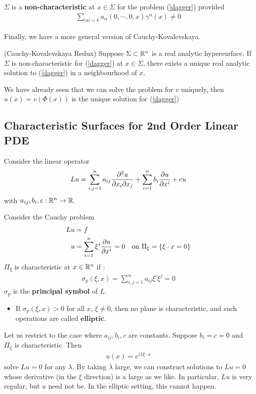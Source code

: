 \documentclass[10pt,a4paper]{report}
\newenvironment{proof}
{\begin{changemargin}{1cm}{0.5cm} 
	}%
	{\end{changemargin}
}
\begin{document}
 $\Sigma$ is a \textbf{non-characteristic} at $x\in \Sigma$ for the problem (\ref{dagger}) provided
\begin{align*}
\sum_{|\alpha| =k} a_{\alpha} (0,\cdots,0,x) \gamma^{\alpha}(x) \neq 0
\end{align*}
\s

Finally, we have a more general version of Cauchy-Kovalevskaya.
\s

\thm (Cauchy-Kovalevskaya Redux) Suppose $\Sigma \subset \mathbb{R}^n$ is a real analytic hypersurface. If $\Sigma$ is non-characteristic for (\ref{dagger}) at $x\in \Sigma$, there exists a unique real analytic solution to (\ref{dagger}) in a neighbourhood of $x$.
\begin{proof}
\pf We have already seen that we can solve the problem for $v$ uniquely, then $u(x)  = v(\Phi(x))$ is the unique solution for (\ref{dagger})

\eop
\end{proof}
\s

\subsection*{Characteristic Surfaces for 2nd Order Linear PDE}

Consider the linear operator
\begin{align*}
Lu = \sum_{i,j=1}^n a_{ij}\frac{\partial^2 u}{\partial x_i \partial x_j} + \sum_{i=1}^n b_i \frac{\partial u}{\partial x^i} + cu
\end{align*}
with $a_{ij},b_i,c : \mathbb{R}^n \rightarrow \mathbb{R}$.
\s

Consider the Cauchy problem
\begin{align*}
Lu& = f \\
u &= \sum_{i=1}^n \xi^i \frac{\partial u}{\partial x^i} = 0 \quad \text{on } \Pi_{\xi} = \{ \xi \cdot x =0 \}
\end{align*}
$\Pi_{\xi}$ is characteristic at $x\in \mathbb{R}^n$ if : 
\begin{align*}
\sigma_p (\xi, x) = \sum_{i,j=1}^n a_{ij}\xi^i \xi^j = 0
\end{align*}
$\sigma_p$ is the \textbf{principal symbol} of $L$. 
\s

\begin{itemize}
\item If $\sigma_p(\xi, x) >0$ for all $x$, $\xi \neq 0$, then no plane is characteristic, and such operations are called $\textbf{elliptic}$. 
\end{itemize}
\s

Let us restrict to the case where $a_{ij},b_i, c$ are constants. Suppose $b_i = c=0$ and $\Pi_{\xi}$ is characteristic. Then
\begin{align*}
u(x) = e^{i\lambda \xi \cdot x}
\end{align*}
solve $Lu =0$ for any $\lambda$. By taking $\lambda$ large, we can construct solutions to $Lu =0$ whose derivative (in the $\xi$ direction) is a large as we like. In particular, $Lu$ is very regular, but $u$ need not be. In the elliptic setting, this cannot happen. 
\s
\end{document}
